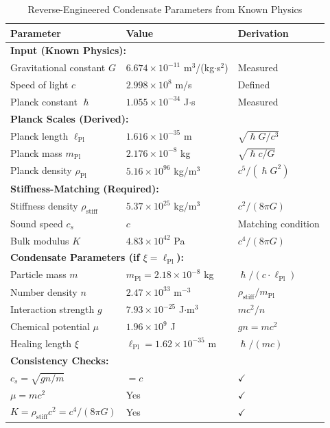 \documentclass[11pt,a4paper]{article}
\newcommand{\ee}[1]{\times 10^{#1}}
\newcommand{\hbar}{\ensuremath{\hslash}}
\newcommand{\lPl}{\ensuremath{\ell_{\mathrm{Pl}}}}
\newcommand{\mPl}{\ensuremath{m_{\mathrm{Pl}}}}
\newcommand{\rhostiff}{\ensuremath{\rho_{\mathrm{stiff}}}}
\newcommand{\rhoPl}{\ensuremath{\rho_{\mathrm{Pl}}}}
\theoremstyle{definition}
\begin{document}
\begin{table}[H]
\centering
\caption{Reverse-Engineered Condensate Parameters from Known Physics}
\label{tab:reverse_engineered}
\begin{tabular}{@{}p{5cm}p{4cm}p{4cm}@{}}
\toprule
\textbf{Parameter} & \textbf{Value} & \textbf{Derivation} \\
\midrule
\multicolumn{3}{l}{\textbf{Input (Known Physics):}} \\
Gravitational constant $G$ & $6.674 \ee{-11}$ m$^3$/(kg$\cdot$s$^2$) & Measured \\
Speed of light $c$ & $2.998 \ee{8}$ m/s & Defined \\
Planck constant $\hbar$ & $1.055 \ee{-34}$ J$\cdot$s & Measured \\
\midrule
\multicolumn{3}{l}{\textbf{Planck Scales (Derived):}} \\
Planck length $\lPl$ & $1.616 \ee{-35}$ m & $\sqrt{\hbar G/c^3}$ \\
Planck mass $\mPl$ & $2.176 \ee{-8}$ kg & $\sqrt{\hbar c/G}$ \\
Planck density $\rhoPl$ & $5.16 \ee{96}$ kg/m$^3$ & $c^5/(\hbar G^2)$ \\
\midrule
\multicolumn{3}{l}{\textbf{Stiffness-Matching (Required):}} \\
Stiffness density $\rhostiff$ & $5.37 \ee{25}$ kg/m$^3$ & $c^2/(8\pi G)$ \\
Sound speed $c_s$ & $c$ & Matching condition \\
Bulk modulus $K$ & $4.83 \ee{42}$ Pa & $c^4/(8\pi G)$ \\
\midrule
\multicolumn{3}{l}{\textbf{Condensate Parameters (if $\xi = \lPl$):}} \\
Particle mass $m$ & $\mPl = 2.18 \ee{-8}$ kg & $\hbar/(c \cdot \lPl)$ \\
Number density $n$ & $2.47 \ee{33}$ m$^{-3}$ & $\rhostiff/\mPl$ \\
Interaction strength $g$ & $7.93 \ee{-25}$ J$\cdot$m$^3$ & $mc^2/n$ \\
Chemical potential $\mu$ & $1.96 \ee{9}$ J & $gn = mc^2$ \\
Healing length $\xi$ & $\lPl = 1.62 \ee{-35}$ m & $\hbar/(mc)$ \\
\midrule
\multicolumn{3}{l}{\textbf{Consistency Checks:}} \\
$c_s = \sqrt{gn/m}$ & $= c$ & $\checkmark$ \\
$\mu = mc^2$ & Yes & $\checkmark$ \\
$K = \rhostiff c^2 = c^4/(8\pi G)$ & Yes & $\checkmark$ \\
\bottomrule
\end{tabular}
\end{table}
\end{document}
